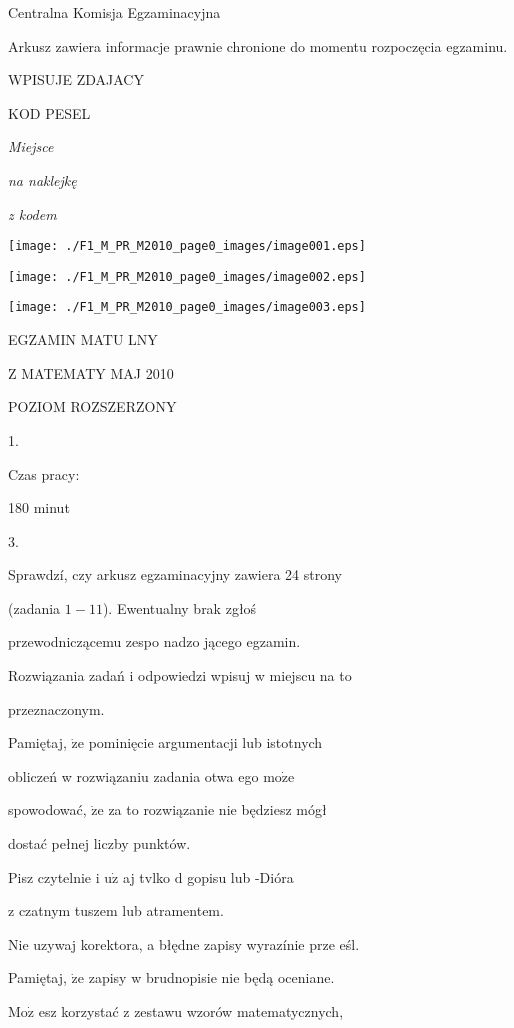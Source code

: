\documentclass[a4paper,12pt]{article}
\begin{document}
Centralna Komisja Egzaminacyjna

Arkusz zawiera informacje prawnie chronione do momentu rozpoczęcia egzaminu.

WPISUJE ZDAJACY

KOD PESEL

{\it Miejsce}

{\it na naklejkę}

{\it z kodem}
\begin{center}
\texttt{[image: ./F1\_M\_PR\_M2010\_page0\_images/image001.eps]}

\texttt{[image: ./F1\_M\_PR\_M2010\_page0\_images/image002.eps]}

\texttt{[image: ./F1\_M\_PR\_M2010\_page0\_images/image003.eps]}
\end{center}
EGZAMIN MATU  LNY

Z MATEMATY  MAJ 2010

POZIOM ROZSZERZONY

1.

Czas pracy:

180 minut

3.

Sprawdzí, czy arkusz egzaminacyjny zawiera 24 strony

(zadania $1-11$). Ewentualny brak zgłoś

przewodniczącemu zespo nadzo jącego egzamin.

Rozwiązania zadań i odpowiedzi wpisuj w miejscu na to

przeznaczonym.

Pamiętaj, $\dot{\mathrm{z}}\mathrm{e}$ pominięcie argumentacji lub istotnych

obliczeń w rozwiązaniu zadania otwa ego $\mathrm{m}\mathrm{o}\dot{\mathrm{z}}\mathrm{e}$

spowodować, $\dot{\mathrm{z}}\mathrm{e}$ za to rozwiązanie nie będziesz mógł

dostać pełnej liczby punktów.

Pisz czytelnie i $\mathrm{u}\dot{\mathrm{z}}$ aj tvlko $\mathrm{d}$ gopisu lub -Dióra

z czatnym tuszem lub atramentem.

Nie uzywaj korektora, a błędne zapisy wyrazínie prze eśl.

Pamiętaj, $\dot{\mathrm{z}}\mathrm{e}$ zapisy w brudnopisie nie będą oceniane.

$\mathrm{M}\mathrm{o}\dot{\mathrm{z}}$ esz korzystać z zestawu wzorów matematycznych,
\end{document}
